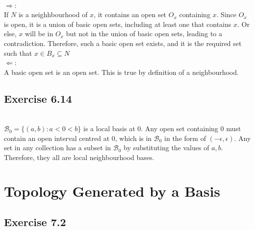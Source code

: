 \begin{solution}
 \\$\Rightarrow$: \\
 If $N$ is a neighhbourhood of $x$, it contains an open set $O_x$ containing $x$. Since $O_x$ is open, it is a union of basic open sets, including at least one that contains $x$. Or else, $x$ will be in $O_x$ but not in the union of basic open sets, leading to a contradiction. Therefore, such a basic open set exists, and it is the required set such that $x \in B_x \subseteq N$ \\
 $\Leftarrow$: \\
 A basic open set is an open set. This is true by definition of a neighbourhood.
 \end{solution}

\subsection{Exercise 6.14}
\setcounter{question}{0}


\begin{solution}
 \\$\mathcal{B}_0 = \{(a,b):a < 0 < b\}$ is a local basis at 0. Any open set containing 0 must contain an open interval centred at 0, which is in $\mathcal{B}_0$ in the form of $(-\epsilon, \epsilon)$. Any set in any collection has a subset in $\mathcal{B}_0$ by substituting the values of $a, b$. Therefore, they all are local neighbourhood bases.
\end{solution}

\section{Topology Generated by a Basis}

\subsection{Exercise 7.2}
\setcounter{question}{0}



